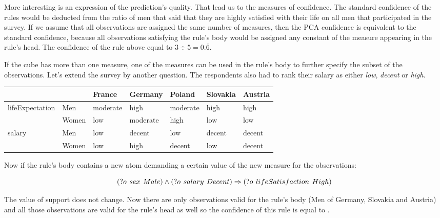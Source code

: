 More interesting is an expression of the prediction's quality. That lead us to the measures of confidence. The standard confidence of the rules would be deducted from the ratio of men that said that they are highly satisfied with their life on all men that participated in the survey. If we assume that all observations are assigned the same number of measures, then the PCA confidence is equivalent to the standard confidence, because all observations satisfying the rule's body would be assigned any constant of the measure appearing in the rule's head. The confidence of the rule above equal to $3 \div 5 = 0.\overline{6}$.

If the cube has more than one measure, one of the measures can be used in the rule's body to further specify the subset of the observations. Let's extend the survey by another question. The respondents also had to rank their salary as either \textit{low}, \textit{decent} or \textit{high}.

\begin{table}[h]
\centering
\begin{tabular}{ll|lllll}
                                 &       & France   & Germany  & Poland   & Slovakia & Austria  \\ 
\hline
\multirow{2}{*}{lifeExpectation} & Men   & moderate & high     & moderate & high     & high     \\
                                     & Women & low      & moderate & high     & low      & low      \\ 
\hline
\multirow{2}{*}{salary}          & Men   & low      & decent   & low      & decent   & decent     \\
                                     & Women & low      & high     & decent   & low      & decent  
\end{tabular}
\end{table}

Now if the rule's body contains a new atom demanding a certain value of the new measure for the observations:

$$ 
(?o\hspace{0.4em}sex\hspace{0.4em}Male) \land (?o\hspace{0.4em}salary\hspace{0.4em}Decent)  \Rightarrow (?o\hspace{0.4em}lifeSatisfaction\hspace{0.4em}High) 
$$

The value of support does not change. Now there are only  observations valid for the rule's body (Men of Germany, Slovakia and Austria) and all those observations are valid for the rule's head as well so the confidence of this rule is equal to .

